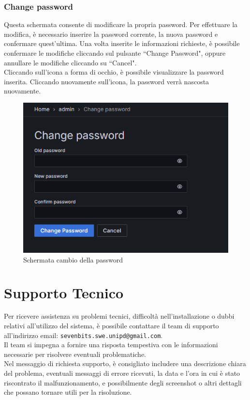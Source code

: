 \documentclass[10pt]{article}
\begin{document}
\begin{justify}
    \subsubsection{Change password}
    Questa schermata consente di modificare la propria password. Per effettuare la modifica, è necessario inserire la password corrente, la nuova password e confermare quest'ultima. Una volta inserite le informazioni richieste, è possibile confermare le modifiche cliccando sul pulsante ``Change Password", oppure annullare le modifiche cliccando su ``Cancel".\\
    Cliccando sull'icona a forma di occhio, è possibile visualizzare la password inserita. Cliccando nuovamente sull'icona, la password verrà nascosta nuovamente.
    \begin{figure}[H]
    \centering
    \includegraphics[width=0.5\linewidth]{password.png}
    \caption{Schermata cambio della password}
    \end{figure}

\newpage

\section{Supporto Tecnico}
\label{sec:supporto}
Per ricevere assistenza su problemi tecnici, difficoltà nell'installazione o dubbi relativi all'utilizzo del sistema, è possibile contattare il team di supporto all'indirizzo email: \texttt{sevenbits.swe.unipd@gmail.com}.\\
Il team si impegna a fornire una risposta tempestiva con le informazioni necessarie per risolvere eventuali problematiche.\\
Nel messaggio di richiesta supporto, è consigliato includere una descrizione chiara del problema, eventuali messaggi di errore ricevuti, la data e l'ora in cui è stato riscontrato il malfunzionamento, e possibilmente degli screenshot o altri dettagli che possano tornare utili per la risoluzione.




\end{justify}
\end{document}
